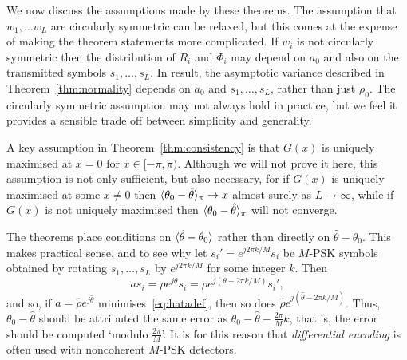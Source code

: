 \documentclass{article}
\begin{document}
We now discuss the assumptions made by these theorems.  The assumption that $w_1, \dots w_L$ are circularly symmetric can be relaxed, but this comes at the expense of making the theorem statements more complicated.  If $w_i$ is not circularly symmetric then the distribution of $R_i$ and $\Phi_i$ may depend on $a_0$ and also on the transmitted symbols $s_1, \dots, s_L$.  In result, the asymptotic variance described in Theorem~\ref{thm:normality} depends on $a_0$ and $s_1, \dots, s_L$, rather than just $\rho_0$.  The circularly symmetric assumption may not always hold in practice, but we feel it provides a sensible trade off between simplicity and generality.

A key assumption in Theorem~\ref{thm:consistency} is that $G(x)$ is uniquely maximised at $x = 0$ for $x \in [-\pi, \pi)$.  %
Although we will not prove it here, this assumption is not only sufficient, but also necessary, for if $G(x)$ is uniquely maximised at some $x \neq 0$ then $\langle \theta_0 - \hat{\theta} \rangle_\pi \rightarrow x$ almost surely as $L\rightarrow\infty$, while if $G(x)$ is not uniquely maximised then $\langle \theta_0 - \hat{\theta} \rangle_\pi$ will not converge.  


The theorems place conditions on $\langle \hat{\theta} - \theta_0 \rangle$ rather than directly on $\hat{\theta} - \theta_0$.  This makes practical sense, and to see why let $s_i' = e^{j2\pi k/M}s_i$ be $M$-PSK symbols obtained by rotating $s_1, \dots, s_L$ by $e^{j2\pi k/M}$ for some integer $k$.  Then
\[
a s_i =  \rho e^{j\theta}s_i = \rho e^{j(\theta - 2\pi k/M)} s_i',
\]
and so, if $a = \hat{\rho}e^{j\hat{\theta}}$ minimises~\eqref{eq:hatadef}, then so does $\hat{\rho} e^{j(\hat{\theta} - 2\pi k/M)}$.  Thus, $\theta_0 - \hat{\theta}$ should be attributed the same error as $\theta_0 - \hat{\theta} - \tfrac{2\pi}{M}k$, that is, the error should be computed `modulo $\tfrac{2\pi}{M}$'.  It is for this reason that \emph{differential encoding} is often used with noncoherent $M$-PSK  detectors. 
\end{document}
